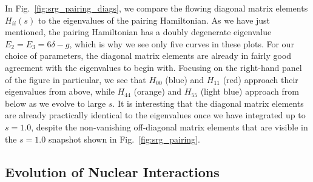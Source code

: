 {\begin{figure*}[t]
\begin{picture}
  \end{picture}
  \caption{\label{fig:srg_pairing_diags}SRG evolution of the pairing Hamiltonian
  with $\delta=1, g=0.5$. The left panel shows the diagonal matrix elements $H_{ii}(s)$ as a function of
  the flow parameter $s$ (dashed lines)  and
  the corresponding eigenvalues (solid lines), the right panel the difference of
  the two numbers. The color coding is the same in both panels.}
\end{figure*}

In Fig.~\ref{fig:srg_pairing_diags}, we compare the flowing diagonal matrix
elements $H_{ii}(s)$ to the eigenvalues of the pairing Hamiltonian. As
we have just mentioned, the pairing Hamiltonian has a doubly degenerate 
eigenvalue $E_2=E_3=6\delta-g$, which is why we see only five curves
in these plots. For our choice of parameters, the diagonal matrix elements
are already in fairly good agreement with the eigenvalues to begin with. Focusing
on the right-hand panel of the figure in particular, we see that $H_{00}$ (blue) 
and $H_{11}$ (red) approach their eigenvalues from above, while 
$H_{44}$ (orange) and $H_{55}$ (light blue) approach from below as we evolve
to large $s$. It is interesting that the diagonal matrix elements 
are already practically identical to the eigenvalues once we have 
integrated up to $s=1.0$, despite the non-vanishing off-diagonal matrix elements 
that are visible in the $s=1.0$ snapshot shown in Fig.~\ref{fig:srg_pairing}.

\subsection{\label{sec:srg_interactions}Evolution of Nuclear Interactions}

%
%
}

